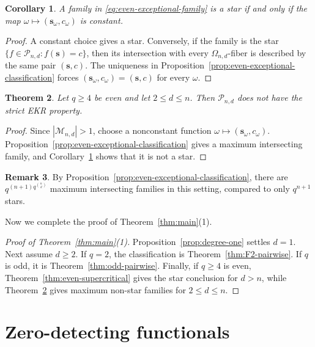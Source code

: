 \documentclass[12pt,reqno]{amsart}
\newtheorem{thm}{Theorem}[section]
\newtheorem{cor}[thm]{Corollary}
\theoremstyle{definition}
\newtheorem{rem}[thm]{Remark}
\newcommand{\cP}{\mathcal P}
\newcommand{\cM}{\mathcal M}
\begin{document}
\begin{cor}\label{cor:even-exceptional-stars}
A family in \eqref{eq:even-exceptional-family} is a star if and only if the map $\omega\mapsto(\mathbf s_\omega,c_\omega)$ is constant.
\end{cor}

\begin{proof}
A constant choice gives a star. Conversely, if the family is the star
$\{f\in\cP_{n,d}:f(\mathbf s)=c\}$, then its intersection with every
$\Omega_{n,d}$-fiber is described by the same pair $(\mathbf s,c)$.
The uniqueness in Proposition~\ref{prop:even-exceptional-classification} forces
$(\mathbf s_\omega,c_\omega)=(\mathbf s,c)$ for every $\omega$.
\end{proof}

\begin{thm}
\label{thm:even-exceptional}
Let $q\geq4$ be even and let $2\leq d\leq n$. Then
$\cP_{n,d}$ does not have the strict EKR property.
\end{thm}

\begin{proof}
Since $|\cM_{n,d}|>1$, choose a nonconstant function 
$\omega\mapsto (\mathbf s_\omega,c_\omega)$. Proposition~\ref{prop:even-exceptional-classification}
gives a maximum intersecting family, and
Corollary~\ref{cor:even-exceptional-stars} shows that it is not a star.
\end{proof}

\begin{rem}\label{rem:even-exceptional-count}
By Proposition~\ref{prop:even-exceptional-classification}, there are $q^{(n+1)q^{\binom{n}{d}}}$ maximum intersecting families in this setting, compared to only $q^{n+1}$ stars.
\end{rem}

Now we complete the proof of Theorem~\ref{thm:main}(1).

\begin{proof}[Proof of Theorem~\ref{thm:main}(1)]
Proposition~\ref{prop:degree-one} settles
$d=1$. Next assume $d\geq2$. If $q=2$, the classification is
Theorem~\ref{thm:F2-pairwise}. If $q$ is odd, it is Theorem~\ref{thm:odd-pairwise}. Finally, if $q\geq4$ is even, Theorem~\ref{thm:even-supercritical} gives the star conclusion for $d>n$, while Theorem~\ref{thm:even-exceptional} gives maximum non-star families for $2\leq d\leq n$. 
\end{proof}

\section{Zero-detecting functionals}\label{sec:GKZ}
\end{document}
